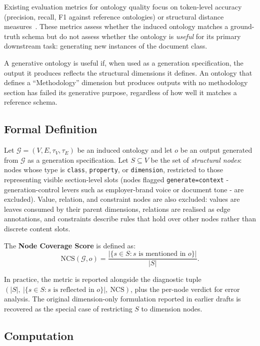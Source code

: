 \documentclass[runningheads,a4paper]{llncs}
\begin{document}
Existing evaluation metrics for ontology quality focus on token-level
accuracy (precision, recall, F1 against reference ontologies) or
structural distance measures~\cite{lo2024endtoend}. These metrics assess
whether the induced ontology matches a ground-truth schema but do not
assess whether the ontology is \emph{useful} for its primary downstream
task: generating new instances of the document class.

A generative ontology is useful if, when used as a generation
specification, the output it produces reflects the structural dimensions
it defines. An ontology that defines a ``Methodology'' dimension but
produces outputs with no methodology section has failed its generative
purpose, regardless of how well it matches a reference schema.

\subsection{Formal Definition}

Let $\mathcal{G} = (V, E, \tau_V, \tau_E)$ be an induced ontology and
let $o$ be an output generated from $\mathcal{G}$ as a generation
specification. Let $S \subseteq V$ be the set of \emph{structural
nodes}: nodes whose type is \texttt{class}, \texttt{property}, or
\texttt{dimension}, restricted to those representing visible
section-level slots (nodes flagged \texttt{generate=context} -
generation-control levers such as employer-brand voice or document
tone - are excluded). Value, relation, and constraint nodes are also
excluded: values are leaves consumed by their parent dimensions,
relations are realised as edge annotations, and constraints describe
rules that hold over other nodes rather than discrete content slots.

The \textbf{Node Coverage Score} is defined as:
\[
  \text{NCS}(\mathcal{G}, o) = \frac{|\{s \in S : s \text{ is mentioned in } o\}|}{|S|}.
\]

{\sloppy
In practice, the metric is reported alongside the diagnostic tuple
$(|S|,\ |\{s \in S : s\text{ is reflected in }o\}|,\ \text{NCS})$, plus
the per-node verdict for error analysis. The original
dimension-only formulation reported in earlier drafts is recovered as
the special case of restricting $S$ to dimension nodes.\par}

\subsection{Computation}
\end{document}
